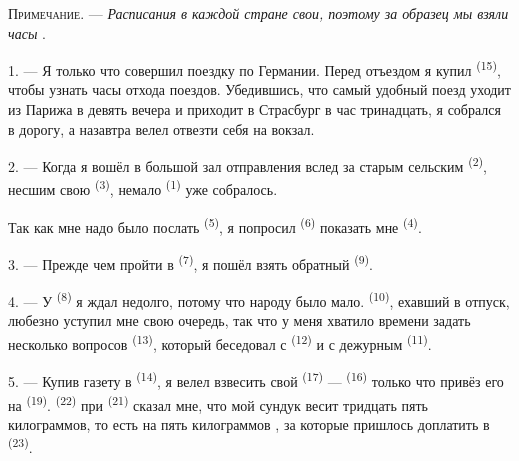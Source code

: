 
\VUsaut{4.0mm}
\VUsaut{2.4mm}
\VUsaut{3.4mm}
\textsc{Примечание.} --- \textit{Расписания в каждой стране свои, поэтому
за образец мы взяли часы} .

1. --- Я только что совершил поездку по Германии. Перед отъездом я купил
 \textsuperscript{(15)}, чтобы узнать часы отхода поездов.
Убедившись, что самый удобный поезд уходит из Парижа в девять вечера и
приходит в Страсбург в час тринадцать, я собрался в дорогу, а назавтра
велел отвезти себя на вокзал.

2. --- Когда я вошёл в большой зал отправления вслед за старым сельским
 \textsuperscript{(2)}, несшим свою 
\textsuperscript{(3)}, немало  \textsuperscript{(1)} уже собралось.

Так как мне надо было послать  \textsuperscript{(5)}, я попросил
 \textsuperscript{(6)} показать мне 
\textsuperscript{(4)}.

3. --- Прежде чем пройти в  \textsuperscript{(7)}, я пошёл
взять обратный  \textsuperscript{(9)}.

4. --- У  \textsuperscript{(8)} я ждал недолго, потому что народу
было мало.  \textsuperscript{(10)}, ехавший в отпуск, любезно
уступил мне свою очередь, так что у меня хватило времени задать несколько
вопросов  \textsuperscript{(13)}, который беседовал с
 \textsuperscript{(12)} и с дежурным
 \textsuperscript{(11)}.

\VUsaut{3.0mm}

5. --- Купив газету в  \textsuperscript{(14)}, я велел взвесить свой
 \textsuperscript{(17)} ---  \textsuperscript{(16)} только
что привёз его на  \textsuperscript{(19)}.
 \textsuperscript{(22)} при  \textsuperscript{(21)} сказал
мне, что мой сундук весит тридцать пять килограммов, то есть на пять
килограммов , за которые пришлось доплатить в
 \textsuperscript{(23)}.

